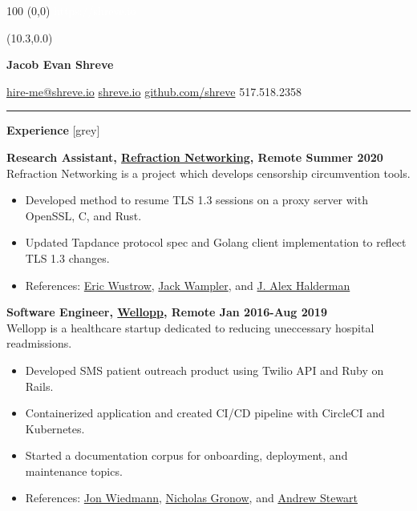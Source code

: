 \documentclass[10pt]{article}
\newcommand{\invisible}[1]{
  \begin{textblock}{100} (0,0)
    \textcolor{white}{#1}
  \end{textblock}
}
\newcommand \fullname {Jacob Evan Shreve}
\newcommand \user {shreve}
\newcommand \phone {517.518.2358}
\newcommand{\sectiontitle}[1]{
  {\color{grey}\rule[0.15cm]{0.5cm}{0.5pt}}
  {\Large\textbf{#1}}
  \xrfill[0.1cm]{0.5pt}[grey]
}
\newcommand{\itempad}{\vspace{0.1in}}
\begin{document}
  \invisible{https://shreve.io}

  \begin{textblock}{0}(10.3,0.0)
  \end{textblock}

  \textbf{\Huge \fullname}

  \vspace{0.15in}
  {\Large \href{mailto:hire-me@shreve.io}{hire-me@\user.io} \hfill
  \href{https://shreve.io}{\user.io} \hfill
  \href{https://github.com/shreve}{github.com/\user} \hfill
  \phone}\\
  \vspace{0.05in}

  \sectiontitle{Experience}
  \vspace{0.1in}

  \textbf{Research Assistant, \href{https://refraction.network/}{Refraction Networking}, Remote \hfill Summer 2020}\\
  Refraction Networking is a project which develops censorship circumvention tools.
  \vspace{-0.07in}
  \begin{itemize}[leftmargin=1em]
    \setlength\itemsep{-0.3em}
    \item Developed method to resume TLS 1.3 sessions on a proxy server with OpenSSL, C, and Rust.
    \item Updated Tapdance protocol spec and Golang client implementation to reflect TLS 1.3 changes.
    \item References: \href{https://ericw.us/trow/}{Eric Wustrow}, \href{https://www.linkedin.com/in/jack-wampler-24a65190/}{Jack Wampler}, and \href{https://jhalderm.com/}{J. Alex Halderman}
  \end{itemize}
\itempad

  \textbf{Software Engineer, \href{https://wellopp.com/}{Wellopp}, Remote \hfill Jan 2016-Aug 2019}\\
  Wellopp is a healthcare startup dedicated to reducing uneccessary hospital readmissions.
  \vspace{-0.07in}
  \begin{itemize}[leftmargin=1em]
    \setlength\itemsep{-0.3em}
    \item Developed SMS patient outreach product using Twilio API and Ruby on Rails.
    \item Containerized application and created CI/CD pipeline with CircleCI and Kubernetes.
    \item Started a documentation corpus for onboarding, deployment, and maintenance topics.
    \item References: \href{https://www.linkedin.com/in/jon-wiedmann-b6442b67/}{Jon Wiedmann},
      \href{https://www.linkedin.com/in/nicholasgronow/}{Nicholas Gronow},
      and \href{https://www.linkedin.com/in/andrew-stewart-95772914b/}{Andrew Stewart}
  \end{itemize}
\itempad
\end{document}

